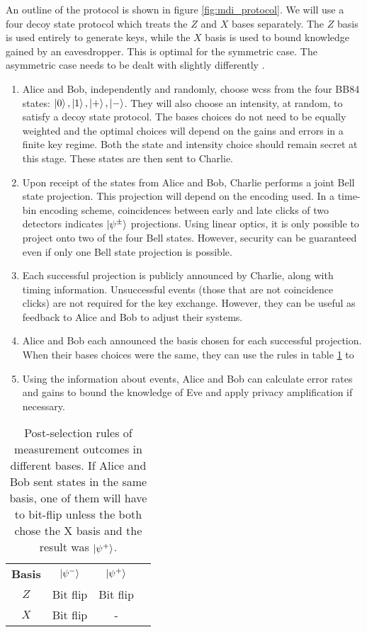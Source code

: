 An outline of the protocol is shown in figure \ref{fig:mdi_protocol}. We will use a four decoy state protocol \cite{zhou2016} which treats the $Z$ and $X$ bases separately. The $Z$ basis is used entirely to generate keys, while the $X$ basis is used to bound knowledge gained by an eavesdropper. This is optimal for the symmetric case. The asymmetric case needs to be dealt with slightly differently \cite{wang2018}.

\begin{enumerate}
	\item {} Alice and Bob, independently and randomly, choose \acp{wcs} from the four BB84 states: $\ket{0}, \ket{1}, \ket{+}, \ket{-}$. They will also choose an intensity, at random, to satisfy a decoy state protocol. The bases choices do not need to be equally weighted and the optimal choices will depend on the gains and errors in a finite key regime. Both the state and intensity choice should remain secret at this stage. These states are then sent to Charlie. 
	\item {} Upon receipt of the states from Alice and Bob, Charlie performs a joint Bell state projection. This projection will depend on the encoding used. In a time-bin encoding scheme, coincidences between early and late clicks of two detectors indicates $\ket{\psi^\pm}$ projections. Using linear optics, it is only possible to project onto two of the four Bell states. However, security can be guaranteed even if only one Bell state projection is possible.
	\item {} Each successful projection is publicly announced by Charlie, along with timing information. Unsuccessful events (those that are not coincidence clicks) are not required for the key exchange. However, they can be useful as feedback to Alice and Bob to adjust their systems.
	\item {} Alice and Bob each announced the basis chosen for each successful projection. When their bases choices were the same, they can use the rules in table \ref{tab:mdi-outcomes} to 
	\item {} Using the information about  events, Alice and Bob can calculate error rates and gains to bound the knowledge of Eve and apply privacy amplification if necessary.
\end{enumerate}

\begin{table}[tbp]
\centering
\begin{tabular}{@{}cccc@{}}
\textbf{Basis}      & $\ket{\psi^-}$     & $\ket{\psi^+}$        \\
$Z$              & Bit flip           & Bit flip                \\
$X$              & Bit flip           & \multicolumn{1}{c}{-}   \\
\end{tabular}
\caption[Measurement outcomes in MDI-QKD]{Post-selection rules of measurement outcomes in different bases. If Alice and Bob sent states in the same basis, one of them will have to bit-flip unless the both chose the X basis and the result was $\ket{\psi^+}$.}
\label{tab:mdi-outcomes}
\end{table}

